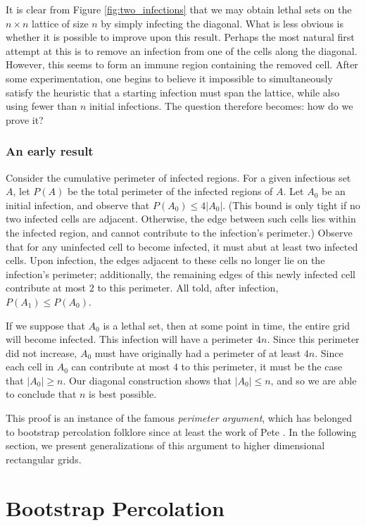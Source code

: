 It is clear from Figure \ref{fig:two_infections} that we may obtain lethal sets on the $n \times n$ lattice of size $n$ by simply infecting the diagonal. What is less obvious is whether it is possible to improve upon this result. Perhaps the most natural first attempt at this is to remove an infection from one of the cells along the diagonal. However, this seems to form an immune region containing the removed cell. After some experimentation, one begins to believe it impossible to simultaneously satisfy the heuristic that a starting infection must span the lattice, while also using fewer than $n$ initial infections. The question therefore becomes: how do we prove it?

\subsubsection{An early result}

Consider the cumulative perimeter of infected regions. For a given infectious set $A$, let $P(A)$ be the total perimeter of the infected regions of $A$. Let $A_0$ be an initial infection, and observe that $P(A_0) \leq 4 |A_0|$. (This bound is only tight if no two infected cells are adjacent. Otherwise, the edge between such cells lies within the infected region, and cannot contribute to the infection's perimeter.) Observe that for any uninfected cell to become infected, it must abut at least two infected cells. Upon infection, the edges adjacent to these cells no longer lie on the infection's perimeter; additionally, the remaining edges of this newly infected cell contribute at most $2$ to this perimeter. All told, after infection, $P(A_1) \leq P(A_0)$. 

If we suppose that $A_0$ is a lethal set, then at some point in time, the entire grid will become infected. This infection will have a perimeter $4n$. Since this perimeter did not increase, $A_0$ must have originally had a perimeter of at least $4n$. Since each cell in $A_0$ can contribute at most $4$ to this perimeter, it must be the case that $|A_0| \geq n$. Our diagonal construction shows that $|A_0| \leq n$, and so we are able to conclude that $n$ is best possible.

This proof is an instance of the famous \emph{perimeter argument}, which has belonged to bootstrap percolation folklore since at least the work of Pete \cite{pete:1997}. In the following section, we present generalizations of this argument to higher dimensional rectangular grids.

\section{Bootstrap Percolation}

